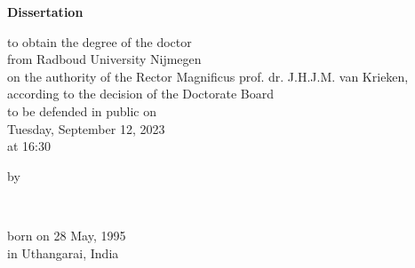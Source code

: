 \begin{titlepage}
    \begin{center}


        \vspace*{2\bigskipamount}

        {\makeatletter
            \titlestyle\bfseries\LARGE\@title
            \makeatother}

        {\makeatletter
            \ifx\@subtitle\undefined\else
                \bigskip
                \titlefont\titleshape\Large\@subtitle
            \fi
            \makeatother}

        \vfill


        {\Large\titlefont\bfseries Dissertation}

        \bigskip
        \bigskip

        to obtain the degree of the doctor\\
        from Radboud University Nijmegen\\
        on the authority of the Rector Magnificus prof. dr. J.H.J.M. van Krieken,\\
        according to the decision of the Doctorate Board\\
        to be defended in public on\\

        \bigskip
        Tuesday, September 12, 2023\\
        at 16:30
        \bigskip
        \bigskip

        by

        \bigskip
        \bigskip

        \makeatletter
        {\Large\titlefont\bfseries\@firstnames\ \MakeUppercase{\titleshape\@lastname}}
        \makeatother

        \bigskip
        \bigskip

        born on 28 May, 1995\\
        in Uthangarai, India\\

        \vspace*{2\bigskipamount}

    \end{center}
    \clearpage


\end{titlepage}
